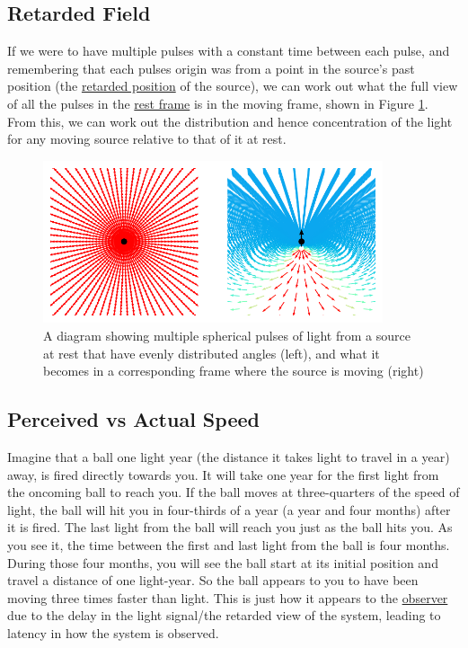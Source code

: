 \subsection{Retarded Field}

If we were to have multiple pulses with a constant time between each pulse, and remembering that each pulses origin was from a point in the source's past position (the \hyperlink{def-retarded-position}{retarded position}  of the source), we can work out what the full view of all the pulses in the \hyperlink{def-proper-frame}{rest frame} is in the moving frame, shown in Figure \ref{fig: full field transformation 1}. From this, we can work out the distribution and hence concentration of the light for any moving source relative to that of it at rest.

\begin{figure}[ht]
	\centering
	\includegraphics[width=10cm]{images/pdf/Still_Retarded_Field_Both_Frames.pdf}
	\caption{ A diagram showing multiple spherical pulses of light from a source at rest that have evenly distributed angles (left), and what it becomes in a corresponding frame where the source is moving (right)}
	\label{fig: full field transformation 1}
\end{figure}

\subsection{Perceived vs Actual Speed}

Imagine that a ball one light year (the distance it takes light to travel in a year) away, is fired directly towards you. It will take one year for the first light from the oncoming ball to reach you. If the ball moves at three-quarters of the speed of light, the ball will hit you in four-thirds of a year (a year and four months) after it is fired. The last light from the ball will reach you just as the ball hits you. As you see it, the time between the first and last light from the ball is four months. During those four months, you will see the ball start at its initial position and travel a distance of one light-year. So the ball appears to you to have been moving three times faster than light. This is just how it appears to the \hyperlink{def-observer}{observer} due to the delay in the light signal/the retarded view of the system, leading to latency in how the system is observed.

